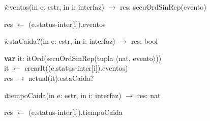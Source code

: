 \vspace{11pt}

\textit{i}eventos(in e: estr, in i: interfaz) $\longrightarrow$ res: secuOrdSinRep(evento)\\
\begin{algorithm}[H]
\BlankLine
res $\leftarrow$ (e.status-inter[i]).eventos
\end{algorithm}

\vspace{11pt}

\textit{i}estaCaida?(in e: estr, in i: interfaz) $\longrightarrow$ res: bool\\
\begin{algorithm}[H]
\BlankLine
\textbf{var} it: itOrd(secuOrdSinRep(tupla $\langle$nat, evento$\rangle$)) \\
\BlankLine
it $\leftarrow$ crearIt((e.status-inter[i]).eventos) \\
\BlankLine
res $\rightarrow$ actual(it).estaCaida?\\
\end{algorithm}

\vspace{11pt}

\textit{i}tiempoCaida(in e: estr, in i: interfaz) $\longrightarrow$ res: nat\\
\begin{algorithm}[H]
res $\leftarrow$ (e.status-inter[i]).tiempoCaida
\end{algorithm}

\vspace{11pt}

